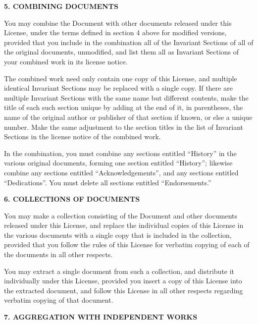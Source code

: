 \begin{center}
{\Large\bf 5. COMBINING DOCUMENTS\par}
\end{center}

You may combine the Document with other documents released under this
License, under the terms defined in section 4 above for modified
versions, provided that you include in the combination all of the
Invariant Sections of all of the original documents, unmodified, and
list them all as Invariant Sections of your combined work in its
license notice.

The combined work need only contain one copy of this License, and
multiple identical Invariant Sections may be replaced with a single
copy.  If there are multiple Invariant Sections with the same name but
different contents, make the title of each such section unique by
adding at the end of it, in parentheses, the name of the original
author or publisher of that section if known, or else a unique number.
Make the same adjustment to the section titles in the list of
Invariant Sections in the license notice of the combined work.

In the combination, you must combine any sections entitled ``History''
in the various original documents, forming one section entitled
``History''; likewise combine any sections entitled ``Acknowledgements'',
and any sections entitled ``Dedications''.  You must delete all sections
entitled ``Endorsements.''


\begin{center}
{\Large\bf 6. COLLECTIONS OF DOCUMENTS\par}
\end{center}

You may make a collection consisting of the Document and other documents
released under this License, and replace the individual copies of this
License in the various documents with a single copy that is included in
the collection, provided that you follow the rules of this License for
verbatim copying of each of the documents in all other respects.

You may extract a single document from such a collection, and distribute
it individually under this License, provided you insert a copy of this
License into the extracted document, and follow this License in all
other respects regarding verbatim copying of that document.


\begin{center}
{\Large\bf 7. AGGREGATION WITH INDEPENDENT WORKS\par}
\end{center}

